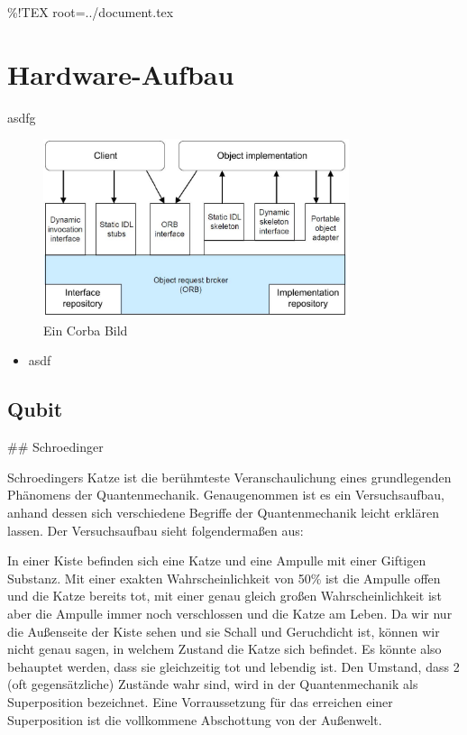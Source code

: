 \%!TEX root=../document.tex

\section{Hardware-Aufbau}
\label{sec:Hardware-Aufbau}

asdfg \cite{brands11}

\begin{figure}[!htb]
	\centering\includegraphics[width=0.8\textwidth]{images/corba.jpg}
	\caption{Ein Corba Bild}
	\label{corba}
\end{figure}

\begin{itemize}
    \item asdf
\end{itemize}


\subsection{Qubit}
\label{sec:Qubit}

## Schroedinger

Schroedingers Katze ist die berühmteste Veranschaulichung eines grundlegenden Phänomens der Quantenmechanik. Genaugenommen ist es ein Versuchsaufbau, anhand dessen sich verschiedene Begriffe der Quantenmechanik leicht erklären lassen. Der Versuchsaufbau sieht folgendermaßen aus:

In einer Kiste befinden sich eine Katze und eine Ampulle mit einer Giftigen Substanz. Mit einer exakten Wahrscheinlichkeit von 50\% ist die Ampulle offen und die Katze bereits tot, mit einer genau gleich großen Wahrscheinlichkeit ist aber die Ampulle immer noch verschlossen und die Katze am Leben. Da wir nur die Außenseite der Kiste sehen und sie Schall und Geruchdicht ist, können wir nicht genau sagen, in welchem Zustand die Katze sich befindet. Es könnte also behauptet werden, dass sie gleichzeitig tot und lebendig ist.
Den Umstand, dass 2 (oft gegensätzliche) Zustände wahr sind, wird in der Quantenmechanik als Superposition bezeichnet. Eine Vorraussetzung für das erreichen einer Superposition ist die vollkommene Abschottung von der Außenwelt. 

